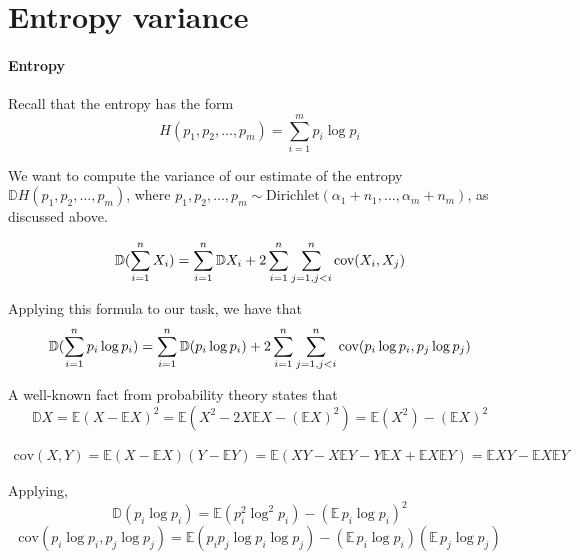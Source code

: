 \documentclass{article}
\begin{document}
\section{Entropy variance}
\paragraph{Entropy} Recall that the entropy has the form
\begin{equation*}
H(p_1, p_2, \ldots, p_m) = \sum_{i = 1}^m{p_i \log p_i}
\end{equation*}

We want to compute the variance of our estimate of the entropy $\mathbb{D}H(p_1, p_2, \ldots, p_m)$, where $p_1, p_2, \ldots, p_m \sim \textrm{Dirichlet}(\alpha_1 + n_1, \ldots, \alpha_m + n_m)$, as discussed above.

\begin{equation}
\mathbb{D}(\sum_{i = 1}^n{X_i}) = \sum_{i=1}^n{\mathbb{D}X_i} + 2 \sum_{i = 1}^n{\sum_{j = 1, \\ j < i}^n{{\textrm{cov}(X_i, X_j)}}}
\end{equation}

Applying this formula to our task, we have that
\begin{equation}
\mathbb{D}(\sum_{i = 1}^n{p_i \log{p_i}}) = \sum_{i=1}^n{\mathbb{D}(p_i \log{p_i})} + 2 \sum_{i = 1}^n{\sum_{j = 1, \\ j < i}^n{{\textrm{cov}(p_i \log{p_i}, p_j \log{p_j})}}}
\end{equation}

A well-known fact from probability theory states that
\begin{equation}
\mathbb{D}X = \mathbb{E}(X - \mathbb{E}X)^2 = \mathbb{E}(X^2 - 2X \mathbb{E}X - (\mathbb{E}X)^2) = \mathbb{E}(X^2) - (\mathbb{E}X)^2
\end{equation}

\begin{multline}
\textrm{cov}(X, Y) = \mathbb{E}(X - \mathbb{E}X)(Y - \mathbb{E}Y) = \mathbb{E}(XY - X \mathbb{E}Y - Y \mathbb{E}X + \mathbb{E}X\mathbb{E}Y) = \mathbb{E}XY - \mathbb{E}X\mathbb{E}Y
\end{multline}

Applying,
\begin{equation}
\mathbb{D}(p_i \log{p_i}) = \mathbb{E}(p_i^2 \log^2{p_i}) - (\mathbb{E} \, p_i \log{p_i})^2 
\end{equation}
\begin{equation}
\textrm{cov}(p_i \log{p_i}, p_j \log{p_j}) = \mathbb{E}(p_i p_j \log{p_i} \log{p_j}) - (\mathbb{E} \, p_i \log{p_i})(\mathbb{E} \, p_j \log{p_j})
\end{equation}
\end{document}
